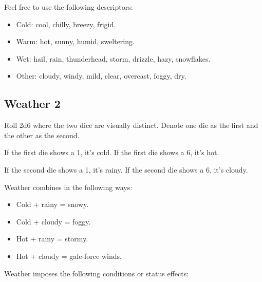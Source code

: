 \documentclass[twoside]{article}
\begin{document}
\bigbreak

Feel free to use the following descriptors: 

\begin{itemize}[nosep]
\item Cold: cool, chilly, breezy, frigid. 
\item Warm: hot, sunny, humid, sweltering. 
\item Wet: hail, rain, thunderhead, storm, drizzle, hazy, snowflakes. 
\item Other: cloudy, windy, mild, clear, overcast, foggy, dry.
\end{itemize}

\subsection*{Weather 2}

Roll 2d6 where the two dice are visually distinct. Denote one die as the first and the other as the second.

\bigbreak

If the first die shows a 1, it's cold. If the first die shows a 6, it's hot.

\bigbreak

If the second die shows a 1, it's rainy. If the second die shows a 6, it's cloudy.

\bigbreak

Weather combines in the following ways:

\begin{itemize}[nosep]
\item Cold + rainy = snowy.
\item Cold + cloudy = foggy.
\item Hot + rainy = stormy.
\item Hot + cloudy = gale-force winds.
\end{itemize}

\bigbreak

Weather imposes the following conditions or status effects:

\bigbreak
\end{document}
